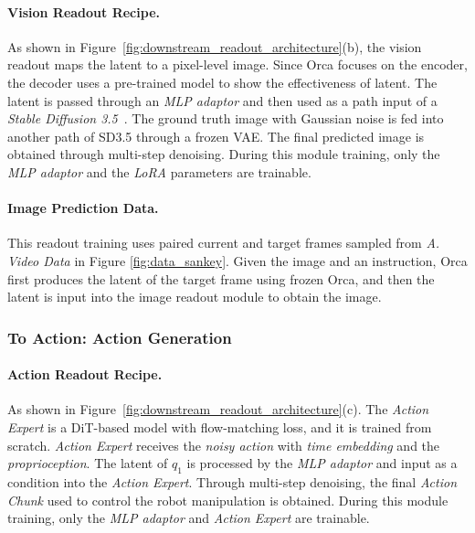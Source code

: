 \paragraph{Vision Readout Recipe.} 

As shown in Figure~\ref{fig:downstream_readout_architecture}(b), the vision readout maps the latent to a pixel-level image. Since Orca focuses on the encoder, the decoder uses a pre-trained model to show the effectiveness of latent.
The latent is passed through an \textit{MLP adaptor} and then used as a path input of a \textit{Stable Diffusion 3.5}~\citep{sd35}. The ground truth image with Gaussian noise is fed into another path of SD3.5 through a frozen VAE. The final predicted image is obtained through multi-step denoising. During this module training, only the \textit{MLP adaptor} and the \textit{LoRA} parameters are trainable. 
% 


\paragraph{Image Prediction Data.}
This readout training uses paired current and target frames sampled from \textit{A. Video Data} in Figure \ref{fig:data_sankey}. Given the image and an instruction, Orca first produces the latent of the target frame using frozen Orca, and then the latent is input into the image readout module to obtain the image.


\subsubsection{To Action: Action Generation} 
\label{sec:downstream_action} 

\paragraph{Action Readout Recipe.} 
As shown in Figure~\ref{fig:downstream_readout_architecture}(c). 
The \textit{Action Expert} is a DiT-based model with flow-matching loss, and it is trained from scratch. \textit{Action Expert} receives the \textit{noisy action} with \textit{time embedding} and the \textit{proprioception}. The latent of $q_1$ is processed by the \textit{MLP adaptor} and input as a condition into the \textit{Action Expert}. Through multi-step denoising, the final \textit{Action Chunk} used to control the robot manipulation is obtained.
During this module training, only the \textit{MLP adaptor} and \textit{Action Expert} are trainable. 


